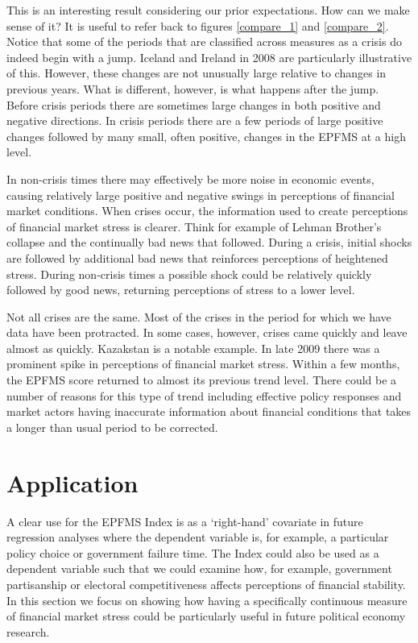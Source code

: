 \documentclass[]{article}
\begin{document}
This is an interesting result considering our prior expectations. How can we make sense of it? It is useful to refer back to figures \ref{compare_1} and \ref{compare_2}. Notice that some of the periods that are classified across measures as a crisis do indeed begin with a jump. Iceland and Ireland in 2008 are particularly illustrative of this. However, these changes are not unusually large relative to changes in previous years. What is different, however, is what happens after the jump. Before crisis periods there are sometimes large changes in both positive and negative directions. In crisis periods there are a few periods of large positive changes followed by many small, often positive, changes in the EPFMS at a high level.

In non-crisis times there may effectively be more noise in economic events, causing relatively large positive and negative swings in perceptions of financial market conditions. When crises occur, the information used to create perceptions of financial market stress is clearer. Think for example of Lehman Brother's collapse and the continually bad news that followed. During a crisis, initial shocks are followed by additional bad news that reinforces perceptions of heightened stress. During non-crisis times a possible shock could be relatively quickly followed by good news, returning perceptions of stress to a lower level.

Not all crises are the same. Most of the crises in the period for which we have data have been protracted. In some cases, however, crises came quickly and leave almost as quickly. Kazakstan is a notable example. In late 2009 there was a prominent spike in perceptions of financial market stress. Within a few months, the EPFMS score returned to almost its previous trend level. There could be a number of reasons for this type of trend including effective policy responses and market actors having inaccurate information about financial conditions that takes a longer than usual period to be corrected.

\section{Application}\label{application}

A clear use for the EPFMS Index is as a `right-hand' covariate in future regression analyses where the dependent variable is, for example, a particular policy choice or government failure time. The Index could also be used as a dependent variable such that we could examine how, for example, government partisanship or electoral competitiveness affects perceptions of financial stability. In this section we focus on showing how having a specifically continuous measure of financial market stress could be particularly useful in future political economy research.
\end{document}
